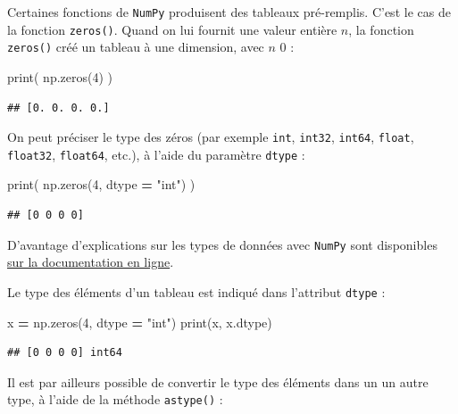 \documentclass[
  12pt,
]{book}
\newenvironment{Shaded}{\begin{snugshade}}{\end{snugshade}}
\newcommand{\BuiltInTok}[1]{#1}
\newcommand{\DecValTok}[1]{\textcolor[rgb]{0.00,0.00,0.81}{#1}}
\newcommand{\NormalTok}[1]{#1}
\newcommand{\OperatorTok}[1]{\textcolor[rgb]{0.81,0.36,0.00}{\textbf{#1}}}
\newcommand{\StringTok}[1]{\textcolor[rgb]{0.31,0.60,0.02}{#1}}
\numberwithin{equation}{section}
\numberwithin{countremarque}{section}
\begin{document}
Certaines fonctions de \texttt{NumPy} produisent des tableaux pré-remplis. C'est le cas de la fonction \texttt{zeros()}. Quand on lui fournit une valeur entière \(n\), la fonction \texttt{zeros()} créé un tableau à une dimension, avec \(n\) 0 :

\begin{Shaded}
\begin{Highlighting}[]
\BuiltInTok{print}\NormalTok{( np.zeros(}\DecValTok{4}\NormalTok{) )}
\end{Highlighting}
\end{Shaded}

\begin{lstlisting}
## [0. 0. 0. 0.]
\end{lstlisting}

On peut préciser le type des zéros (par exemple \texttt{int}, \texttt{int32}, \texttt{int64}, \texttt{float}, \texttt{float32}, \texttt{float64}, etc.), à l'aide du paramètre \texttt{dtype} :

\begin{Shaded}
\begin{Highlighting}[]
\BuiltInTok{print}\NormalTok{( np.zeros(}\DecValTok{4}\NormalTok{, dtype }\OperatorTok{=} \StringTok{"int"}\NormalTok{) )}
\end{Highlighting}
\end{Shaded}

\begin{lstlisting}
## [0 0 0 0]
\end{lstlisting}

D'avantage d'explications sur les types de données avec \texttt{NumPy} sont disponibles \href{https://docs.scipy.org/doc/numpy-1.15.1/reference/arrays.dtypes.html}{sur la documentation en ligne}.

Le type des éléments d'un tableau est indiqué dans l'attribut \texttt{dtype} :

\begin{Shaded}
\begin{Highlighting}[]
\NormalTok{x }\OperatorTok{=}\NormalTok{ np.zeros(}\DecValTok{4}\NormalTok{, dtype }\OperatorTok{=} \StringTok{"int"}\NormalTok{)}
\BuiltInTok{print}\NormalTok{(x, x.dtype)}
\end{Highlighting}
\end{Shaded}

\begin{lstlisting}
## [0 0 0 0] int64
\end{lstlisting}

Il est par ailleurs possible de convertir le type des éléments dans un un autre type, à l'aide de la méthode \texttt{astype()} :
\end{document}
